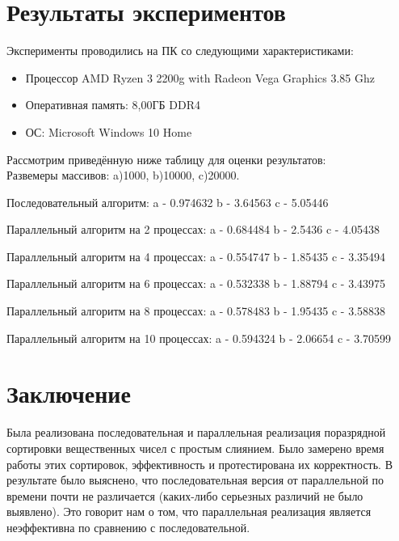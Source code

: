 \documentclass{report}
\begin{document}
\section*{Результаты экспериментов}
Эксперименты проводились на ПК со следующими характеристиками:

\begin{itemize}
\item Процессор AMD Ryzen 3 2200g with Radeon Vega Graphics 3.85 Ghz
\item Оперативная память: 8,00ГБ DDR4
\item ОС: Microsoft Windows 10 Home
\end{itemize}

\par Рассмотрим приведённую ниже таблицу для оценки результатов:
\\

Развемеры массивов: a)1000, b)10000, c)20000.
\par Последовательный алгоритм: a - 0.974632 b - 3.64563 c - 5.05446
\par Параллельный алгоритм на 2 процессах:  a - 0.684484 b - 2.5436  c - 4.05438
\par Параллельный алгоритм на 4 процессах:  a - 0.554747 b - 1.85435 c - 3.35494
\par Параллельный алгоритм на 6 процессах:  a - 0.532338 b - 1.88794 c - 3.43975
\par Параллельный алгоритм на 8 процессах:  a - 0.578483 b - 1.95435 c - 3.58838
\par Параллельный алгоритм на 10 процессах: a - 0.594324 b - 2.06654 c - 3.70599





\newpage

\section*{Заключение}
\par Была реализована последовательная и параллельная реализация поразрядной сортировки вещественных чисел с простым слиянием. Было замерено время работы этих сортировок, эффективность и протестирована их корректность. В результате было выяснено, что последовательная версия от параллельной по времени почти не различается (каких-либо серьезных различий не было выявлено). Это говорит нам о том, что параллельная реализация является неэффективна по сравнению с последовательной.
\end{document}
